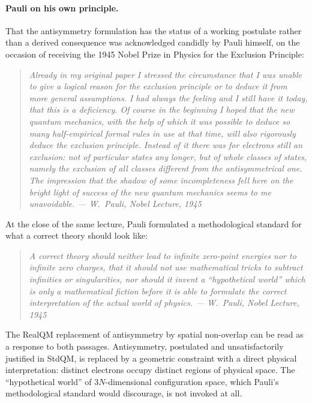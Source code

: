 \paragraph{Pauli on his own principle.}
That the antisymmetry formulation has the status of a working postulate rather than a derived consequence was acknowledged candidly by Pauli himself, on the occasion of receiving the 1945 Nobel Prize in Physics for the Exclusion Principle:

\begin{quote}
\itshape Already in my original paper I stressed the circumstance that I was unable to give a logical reason for the exclusion principle or to deduce it from more general assumptions. I had always the feeling and I still have it today, that this is a deficiency. Of course in the beginning I hoped that the new quantum mechanics, with the help of which it was possible to deduce so many half-empirical formal rules in use at that time, will also rigorously deduce the exclusion principle. Instead of it there was for electrons still an exclusion: not of particular states any longer, but of whole classes of states, namely the exclusion of all classes different from the antisymmetrical one. The impression that the shadow of some incompleteness fell here on the bright light of success of the new quantum mechanics seems to me unavoidable. \normalfont\hfill --- W.~Pauli, Nobel Lecture, 1945
\end{quote}

At the close of the same lecture, Pauli formulated a methodological standard for what a correct theory should look like:

\begin{quote}
\itshape A correct theory should neither lead to infinite zero-point energies nor to infinite zero charges, that it should not use mathematical tricks to subtract infinities or singularities, nor should it invent a ``hypothetical world'' which is only a mathematical fiction before it is able to formulate the correct interpretation of the actual world of physics. \normalfont\hfill --- W.~Pauli, Nobel Lecture, 1945
\end{quote}

The RealQM replacement of antisymmetry by spatial non-overlap can be read as a response to both passages. Antisymmetry, postulated and unsatisfactorily justified in StdQM, is replaced by a geometric constraint with a direct physical interpretation: distinct electrons occupy distinct regions of physical space. The ``hypothetical world'' of $3N$-dimensional configuration space, which Pauli's methodological standard would discourage, is not invoked at all.

